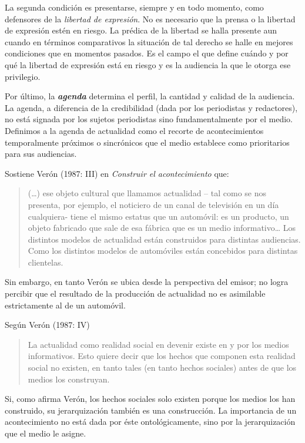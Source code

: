 {La segunda condición es presentarse, siempre y en todo momento, como defensores de la \emph{libertad de expresión}. No es necesario que la prensa o la libertad de expresión estén en riesgo. La prédica de la libertad se halla presente aun cuando en términos comparativos la situación de tal derecho se halle en mejores condiciones que en momentos pasados. Es el campo el que define cuándo y por qué la libertad de expresión está en riesgo y es la audiencia la que le otorga ese privilegio.

Por último, la \emph{\textbf{agenda}} determina el perfil, la cantidad y calidad de la audiencia. La agenda, a diferencia de la credibilidad (dada por los periodistas y redactores), no está signada por los sujetos periodistas sino fundamentalmente por el medio. Definimos a la agenda de actualidad como el recorte de acontecimientos temporalmente próximos o sincrónicos que el medio establece como prioritarios para sus audiencias.

Sostiene Verón (1987: III) en \emph{Construir el acontecimiento} que:

\begin{quote}
(\ldots) ese objeto cultural que llamamos actualidad -- tal como se nos presenta, por ejemplo, el noticiero de un canal de televisión en un día cualquiera- tiene el mismo estatus que un automóvil: es un producto, un objeto fabricado que sale de esa fábrica que es un medio informativo\ldots{} Los distintos modelos de actualidad están construidos para distintas audiencias. Como los distintos modelos de automóviles están concebidos para distintas clientelas.
\end{quote}

Sin embargo, en tanto Verón se ubica desde la perspectiva del emisor; no logra percibir que el resultado de la producción de actualidad no es asimilable estrictamente al de un automóvil.

Según Verón (1987: IV)

\begin{quote}
La actualidad como realidad social en devenir existe en y por los medios informativos. Esto quiere decir que los hechos que componen esta realidad social no existen, en tanto tales (en tanto hechos sociales) antes de que los medios los construyan.
\end{quote}

Si, como afirma Verón, los hechos sociales solo existen porque los medios los han construido, su jerarquización también es una construcción. La importancia de un acontecimiento no está dada por éste ontológicamente, sino por la jerarquización que el medio le asigne.

}
